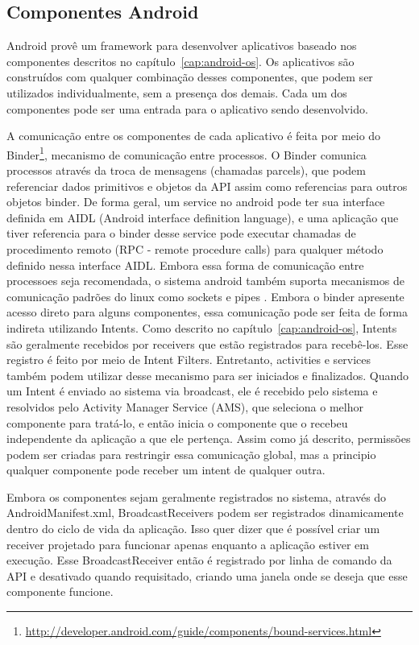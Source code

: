 
\subsection{Componentes Android}

Android provê um framework para desenvolver aplicativos baseado nos componentes descritos no capítulo~\ref{cap:android-os}. Os aplicativos são construídos com qualquer combinação desses componentes, que podem ser utilizados individualmente, sem a presença dos demais. Cada um dos componentes pode ser uma entrada para o aplicativo sendo desenvolvido.

A comunicação entre os componentes de cada aplicativo é feita por meio do Binder\footnote{\url{http://developer.android.com/guide/components/bound-services.html}}, mecanismo de comunicação entre processos. O Binder comunica processos através da troca de mensagens (chamadas parcels), que podem referenciar dados primitivos e objetos da API assim como referencias para outros objetos binder. De forma geral, um service no android pode ter sua interface definida em AIDL (Android interface definition language), e uma aplicação que tiver referencia para o binder desse service pode executar chamadas de procedimento remoto (RPC - remote procedure calls) para qualquer método definido nessa interface AIDL. Embora essa forma de comunicação entre processoes seja recomendada, o sistema android também suporta mecanismos de comunicação padrões do linux como sockets e pipes \cite{heuser2014}. Embora o binder apresente acesso direto para alguns componentes, essa comunicação pode ser feita de forma indireta utilizando Intents. Como descrito no capítulo~\ref{cap:android-os}, Intents são geralmente recebidos por receivers que estão registrados para recebê-los. Esse registro é feito por meio de Intent Filters. Entretanto, activities e services também podem utilizar desse mecanismo para ser iniciados e finalizados. Quando um Intent é enviado ao sistema via broadcast, ele é recebido pelo sistema e resolvidos pelo Activity Manager Service (AMS), que seleciona o melhor componente para tratá-lo, e então inicia o componente que o recebeu independente da aplicação a que ele pertença. Assim como já descrito, permissões podem ser criadas para restringir essa comunicação global, mas a principio qualquer componente pode receber um intent de qualquer outra. 

Embora os componentes sejam geralmente registrados no sistema, através do AndroidManifest.xml, BroadcastReceivers podem ser registrados dinamicamente dentro do ciclo de vida da aplicação. Isso quer dizer que é possível criar um receiver projetado para funcionar apenas enquanto a aplicação estiver em execução. Esse BroadcastReceiver então é registrado por linha de comando da API e desativado quando requisitado, criando uma janela onde se deseja que esse componente funcione.

